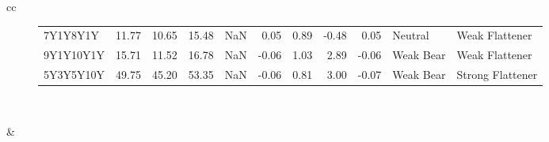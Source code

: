 \documentclass[a4paper,twoside]{report}
\begin{document}
\begin{figure}[htbp]
\begin{tabular}[c]{cc}
\begin{subfigure}[c]{0.5\textwidth}
\begin{adjustbox}{max width=\textwidth}
\begin{tabular}{lrrrrrrrrll}
  7Y1Y8Y1Y &   11.77 &    10.65 &     15.48 &    NaN &  0.05 &      0.89 &  -0.48 &     0.05 &      Neutral &    Weak Flattener \\
 9Y1Y10Y1Y &   15.71 &    11.52 &     16.78 &    NaN & -0.06 &      1.03 &   2.89 &    -0.06 &    Weak Bear &    Weak Flattener \\
 5Y3Y5Y10Y &   49.75 &    45.20 &     53.35 &    NaN & -0.06 &      0.81 &   3.00 &    -0.07 &    Weak Bear &  Strong Flattener \\
\hline
\end{tabular}
\end{adjustbox}
\end{subfigure}\\
 
 

\begin{subfigure}[c]{0.5\textwidth}
 
 \null\hfill
 \end{subfigure}&
 

\end{tabular}
\end{figure}
\end{document}
